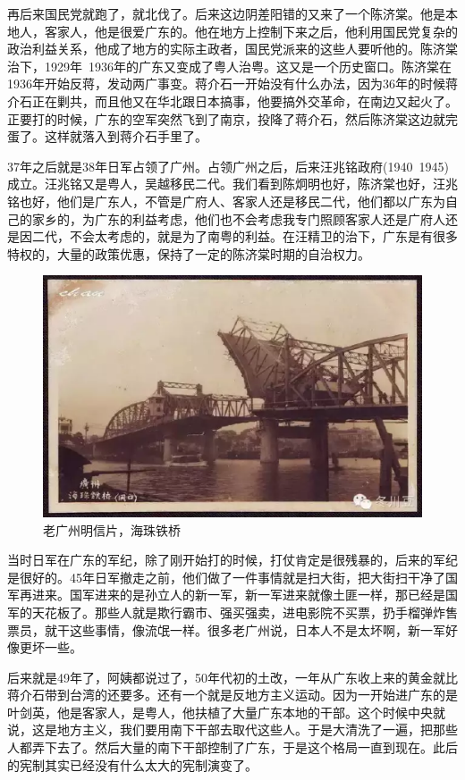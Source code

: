 再后来国民党就跑了，就北伐了。后来这边阴差阳错的又来了一个陈济棠。他是本地人，客家人，他是很爱广东的。他在地方上控制下来之后，他利用国民党复杂的政治利益关系，他成了地方的实际主政者，国民党派来的这些人要听他的。陈济棠治下，1929年~1936年的广东又变成了粤人治粤。这又是一个历史窗口。陈济棠在1936年开始反蒋，发动两广事变。蒋介石一开始没有什么办法，因为36年的时候蒋介石正在剿共，而且他又在华北跟日本搞事，他要搞外交革命，在南边又起火了。正要打的时候，广东的空军突然飞到了南京，投降了蒋介石，然后陈济棠这边就完蛋了。这样就落入到蒋介石手里了。

37年之后就是38年日军占领了广州。占领广州之后，后来汪兆铭政府(1940~1945)成立。汪兆铭又是粤人，吴越移民二代。我们看到陈炯明也好，陈济棠也好，汪兆铭也好，他们是广东人，不管是广府人、客家人还是移民二代，他们都以广东为自己的家乡的，为广东的利益考虑，他们也不会考虑我专门照顾客家人还是广府人还是因二代，不会太考虑的，就是为了南粤的利益。在汪精卫的治下，广东是有很多特权的，大量的政策优惠，保持了一定的陈济棠时期的自治权力。

\begin{figure}
	\centering
	\includegraphics[width=\textwidth]{images/image-80}
	\caption{老广州明信片，海珠铁桥}
\end{figure}

当时日军在广东的军纪，除了刚开始打的时候，打仗肯定是很残暴的，后来的军纪是很好的。45年日军撤走之前，他们做了一件事情就是扫大街，把大街扫干净了国军再进来。国军进来的是孙立人的新一军，新一军进来就像土匪一样，那已经是国军的天花板了。那些人就是欺行霸市、强买强卖，进电影院不买票，扔手榴弹炸售票员，就干这些事情，像流氓一样。很多老广州说，日本人不是太坏啊，新一军好像更坏一些。

后来就是49年了，阿姨都说过了，50年代初的土改，一年从广东收上来的黄金就比蒋介石带到台湾的还要多。还有一个就是反地方主义运动。因为一开始进广东的是叶剑英，他是客家人，是粤人，他扶植了大量广东本地的干部。这个时候中央就说，这是地方主义，我们要用南下干部去取代这些人。于是大清洗了一遍，把那些人都弄下去了。然后大量的南下干部控制了广东，于是这个格局一直到现在。此后的宪制其实已经没有什么太大的宪制演变了。

